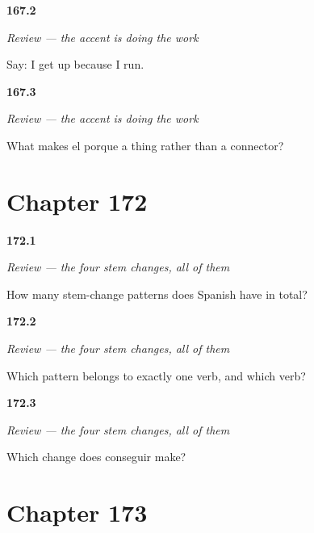 \noindent\begin{minipage}[t]{\linewidth}
\raggedright
\hypertarget{review-ES-C38-repaso-los-tres-porques-give}{\textbf{167.2}} \emph{Review — the accent is doing the work}\par
\small Say: I get up because I run.
\end{minipage}\par\medskip

\noindent\begin{minipage}[t]{\linewidth}
\raggedright
\hypertarget{review-ES-C38-repaso-los-tres-porques-noun}{\textbf{167.3}} \emph{Review — the accent is doing the work}\par
\small What makes el porque a thing rather than a connector?
\end{minipage}\par\medskip

\section*{Chapter 172}

\noindent\begin{minipage}[t]{\linewidth}
\raggedright
\hypertarget{review-ES-C39-repaso-cambios-count}{\textbf{172.1}} \emph{Review — the four stem changes, all of them}\par
\small How many stem-change patterns does Spanish have in total?
\end{minipage}\par\medskip

\noindent\begin{minipage}[t]{\linewidth}
\raggedright
\hypertarget{review-ES-C39-repaso-cambios-only}{\textbf{172.2}} \emph{Review — the four stem changes, all of them}\par
\small Which pattern belongs to exactly one verb, and which verb?
\end{minipage}\par\medskip

\noindent\begin{minipage}[t]{\linewidth}
\raggedright
\hypertarget{review-ES-C39-repaso-cambios-ei}{\textbf{172.3}} \emph{Review — the four stem changes, all of them}\par
\small Which change does conseguir make?
\end{minipage}\par\medskip

\section*{Chapter 173}

